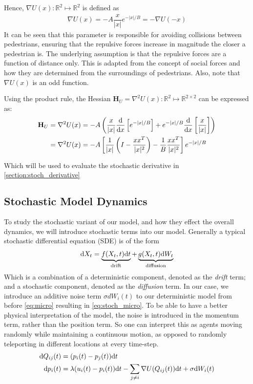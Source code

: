 Hence, $\nabla U(x):\mathbb{R}^2 \mapsto \mathbb{R}^2$ is defined as
\begin{align} 
    \nabla U(x) = -A\dfrac{x}{|x|}e^{-|x|/B} = -\nabla U(-x)
    \label{eq:def_U}
\end{align}
It can be seen that this parameter is responsible for avoiding collisions between pedestrians, ensuring that the repulsive forces increase in magnitude the closer a pedestrian is. The underlying assumption is that the repulsive forces are a function of distance only. This is adapted from the concept of social forces and how they are determined from the surroundings of pedestrians. Also, note that $\nabla U(x)$ is an odd function.

Using the product rule, the Hessian $\mathbf{H}_U = \nabla ^2 U(x):\mathbb{R}^2 \mapsto \mathbb{R}^{2\times2}$ can be expressed as:
\begin{align}
    \mathbf{H}_U &= \nabla^2 U(x) = -A\left(\dfrac{x}{|x|}\dfrac{\mathrm d}{\mathrm d x} \left[ e^{-|x|/B} \right] + e^{-|x|/B}\dfrac{\mathrm d}{\mathrm d x} \left[\dfrac{x}{|x|}\right]\right) \nonumber \\ 
    &= \nabla^2 U(x) = -A\left[\dfrac{1}{|x|}\left(I - \dfrac{xx^T}{|x|^2}\right) - \dfrac{1}{B}\dfrac{xx^T}{|x|^2}\right]e^{-|x|/B}
    \label{eq:def_ddU}
\end{align}

Which will be used to evaluate the stochastic derivative in \autoref{section:stoch_derivative}

\subsection{Stochastic Model Dynamics}

To study the stochastic variant of our model, and how they effect the overall dynamics, we will introduce stochastic terms into our model. Generally a typical stochastic differential equation (SDE) is of the form
\begin{equation*}
    \mathrm d X_t = \underbrace{f(X_t, t)\mathrm d t}_{\text{drift}} + \underbrace{g(X_t, t)\mathrm d W_t}_{\text{diffusion}}
\end{equation*}
Which is a combination of a deterministic component, denoted as the \textit{drift} term; and a stochastic component, denoted as the \textit{diffusion} term. In our case, we introduce an additive noise term $\sigma dW_i(t)$ to our deterministic model from before \autoref{eq:micro} resulting in \autoref{eq:stoch_micro}. To be able to have a better physical interpretation of the model, the noise is introduced in the momentum term, rather than the position term. So one can interpret this as agents moving randomly while maintaining a continuous motion, as opposed to randomly teleporting in different locations at every time-step.
\begin{gather}
\begin{aligned}
    \mathrm d Q_{ij}(t) &= (p_i(t) - p_j(t))\mathrm d t \\
    \mathrm d p_i(t) &= \lambda(u_i(t) - p_i(t))\mathrm d t - \sum_{j \neq i} \nabla U (Q_{ij}(t))\mathrm d t + \sigma \mathrm d W_i(t)
    \label{eq:stoch_micro}
\end{aligned}
\end{gather}

